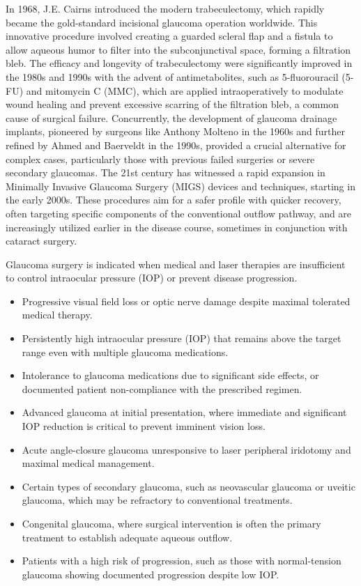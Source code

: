 In 1968, J.E. Cairns introduced the modern trabeculectomy, which rapidly became the gold-standard incisional glaucoma operation worldwide. This innovative procedure involved creating a guarded scleral flap and a fistula to allow aqueous humor to filter into the subconjunctival space, forming a filtration bleb. The efficacy and longevity of trabeculectomy were significantly improved in the 1980s and 1990s with the advent of antimetabolites, such as 5-fluorouracil (5-FU) and mitomycin C (MMC), which are applied intraoperatively to modulate wound healing and prevent excessive scarring of the filtration bleb, a common cause of surgical failure. Concurrently, the development of glaucoma drainage implants, pioneered by surgeons like Anthony Molteno in the 1960s and further refined by Ahmed and Baerveldt in the 1990s, provided a crucial alternative for complex cases, particularly those with previous failed surgeries or severe secondary glaucomas. The 21st century has witnessed a rapid expansion in Minimally Invasive Glaucoma Surgery (MIGS) devices and techniques, starting in the early 2000s. These procedures aim for a safer profile with quicker recovery, often targeting specific components of the conventional outflow pathway, and are increasingly utilized earlier in the disease course, sometimes in conjunction with cataract surgery.

Glaucoma surgery is indicated when medical and laser therapies are insufficient to control intraocular pressure (IOP) or prevent disease progression.

\begin{itemize}
  \item Progressive visual field loss or optic nerve damage despite maximal tolerated medical therapy.
  \item Persistently high intraocular pressure (IOP) that remains above the target range even with multiple glaucoma medications.
  \item Intolerance to glaucoma medications due to significant side effects, or documented patient non-compliance with the prescribed regimen.
  \item Advanced glaucoma at initial presentation, where immediate and significant IOP reduction is critical to prevent imminent vision loss.
  \item Acute angle-closure glaucoma unresponsive to laser peripheral iridotomy and maximal medical management.
  \item Certain types of secondary glaucoma, such as neovascular glaucoma or uveitic glaucoma, which may be refractory to conventional treatments.
  \item Congenital glaucoma, where surgical intervention is often the primary treatment to establish adequate aqueous outflow.
  \item Patients with a high risk of progression, such as those with normal-tension glaucoma showing documented progression despite low IOP.
\end{itemize}


